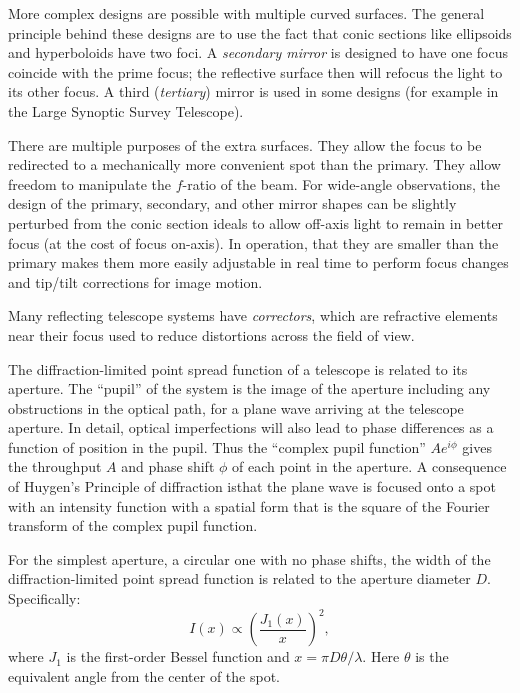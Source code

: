 More complex designs are possible with multiple curved surfaces. The
general principle behind these designs are to use the fact that conic
sections like ellipsoids and hyperboloids have two foci. A {\it
secondary mirror} is designed to have one focus coincide with the
prime focus; the reflective surface then will refocus the light to its
other focus. A third ({\it tertiary}) mirror is used in some designs
(for example in the Large Synoptic Survey Telescope).

There are multiple purposes of the extra surfaces. They allow the
focus to be redirected to a mechanically more convenient spot than the
primary. They allow freedom to manipulate the $f$-ratio of the
beam. For wide-angle observations, the design of the primary,
secondary, and other mirror shapes can be slightly perturbed from the
conic section ideals to allow off-axis light to remain in better focus
(at the cost of focus on-axis). In operation, that they are smaller
than the primary makes them more easily adjustable in real time to
perform focus changes and tip/tilt corrections for image motion.

Many reflecting telescope systems have {\it correctors}, which are
refractive elements near their focus used to reduce distortions across
the field of view.

The diffraction-limited point spread function of a telescope is
related to its aperture. The ``pupil'' of the system is the image of
the aperture including any obstructions in the optical path, for a
plane wave arriving at the telescope aperture. In detail, optical
imperfections will also lead to phase differences as a function of
position in the pupil. Thus the ``complex pupil function'' $A
e^{i\phi}$ gives the throughput $A$ and phase shift $\phi$ of each
point in the aperture. A consequence of Huygen's Principle of
diffraction isthat the plane wave is focused onto a spot with an
intensity function with a spatial form that is the square of the
Fourier transform of the complex pupil function.

For the simplest aperture, a circular one with no phase shifts, the
width of the diffraction-limited point spread function is related to
the aperture diameter $D$. Specifically:
\begin{equation}
I(x) \propto \left(\frac{J_1(x)}{x}\right)^2,
\end{equation}
where $J_1$ is the first-order Bessel function and $x=\pi D \theta
/\lambda$. Here $\theta$ is the equivalent angle from the center of
the spot. 

